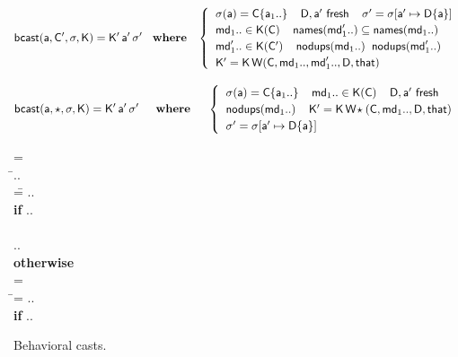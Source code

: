 \documentclass[a4paper,USenglish]{tex/lipics-v2016}
\begin{document}
\begin{figure}[!h]
\hrulefill
\small

\vspace{-4mm}

\begin{equation*}
  \behcastE\a\Cp\s\K \Kp\ap\sp \HS\WHERE\HS \begin{cases}
\HS  \App\s\a = \obj\C{\a[1]..} \HS\HS
  \fresh{\D,\ap} \HS\HS
  \sp = \Map \s{\Bind\ap{\obj\D{\a}}} \\\HS
  \md[1].. \In \App\K\C \HS\HS \names{\mdp[1]..} \subseteq \names{\md[1]..} \\\HS
  \mdp[1].. \In \App\K\Cp \HS\HS \cload{\md[1]..} \HS \cload{\mdp[1]..} \\\HS
  \Kp = \K\,\wrap\C{\md[1]..}{\mdp[1]..}\D\that 

  \end{cases}
\end{equation*}

\begin{equation*}
  \behcastE\a\any\s\K \Kp\ap\sp  \HS\HS\WHERE\HS\HS\begin{cases}\HS
  \App\s\a = \obj\C{\a[1]..} \HS\HS \md[1].. \In \App\K\C \HS\HS
  \fresh{\D,\ap} \\\HS \cload{\md[1]..} \HS\HS
  \Kp = \K\,\wrapAny\C{\md[1]..}\D\that \\\HS
  \sp = \Map \s{\Bind\ap{\obj\D{\a}}} 
\end{cases}\end{equation*}


\hrulefill
\vspace{-2mm}\caption{Behavioral casts.}\label{behavetext}

\hrulefill
\small

\begin{tabbing}\small
  \wrap{}\D\that = \\
  \HS\HS\WHERE\HS\= \Mdef\m\x{\t[1]}{\t[2]}\e\In\md[1].. \\
                 \> \mdpp[1] =\= \src{\Mdef\m\x{\tp[1]}{\tp[2]}{~\BehCast{\tp[2]}{\KCall{\FRead\that}\m{\bscast{\tp[1]}\x}{\t[1]}{\t[2]}}}} .. \\
\> \> \HS\HS \= \textbf{if} \HS \Mdef\m\x{\tp[1]}{\tp[2]}\ep\In\mdp[1].. \\
\\[-3mm]
\> \>  \src{\Mdef\m\x{\t[1]}{\t[2]}{~\KCall{\FRead\that}\m{\x}{\t[1]}{\t[2]}}} .. \\ \> \> \HS\HS \textbf{otherwise}
\\[3mm]
   = \\
\HS\HS\WHERE\HS\=\mdp[1] = \src{ \Mdef\m\x{\any}{\any}{~\BehCast\any{ \KCall{\FRead\that} \m {\bscast{\t}\x}{\t}{\tp}} } }   ..
    \HS\HS\HS\HS \\ \> \> \HS\HS \= \textbf{if} \HS \Mdef\m\x{\t}{\tp}\e\In\md[1].. \\
\end{tabbing}


\end{figure}
\end{document}
